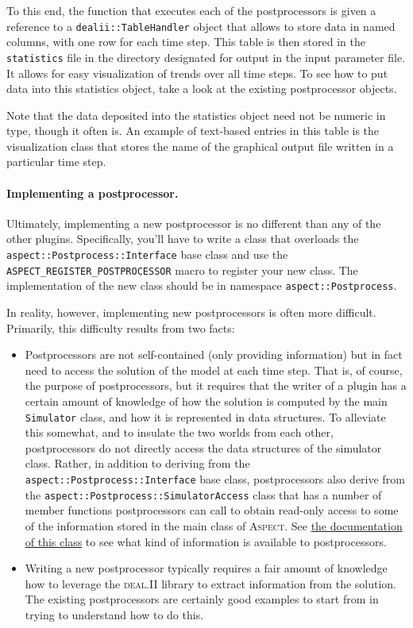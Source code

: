 \documentclass{article}
\newcommand{\dealii}{{\textsc{deal.II}}}
\newcommand{\aspect}{\textsc{Aspect}}
\begin{document}
To this end, the function that executes each of the postprocessors is given a
reference to a \texttt{dealii::TableHandler} object that allows to store data
in named columns, with one row for each time step. This table is then stored
in the \texttt{statistics} file in the directory designated for output in the
input parameter file. It allows for easy visualization of trends over all time
steps. To see how to put data into this statistics object, take a look at the
existing postprocessor objects.

Note that the data deposited into the statistics object need not be numeric in
type, though it often is. An example of text-based entries in this table is
the visualization class that stores the name of the graphical output file
written in a particular time step.

\paragraph{Implementing a postprocessor.}
Ultimately, implementing a new postprocessor is no different than any of the
other plugins. Specifically, you'll have to write a class that
overloads the \texttt{aspect::Postprocess::Interface} base class and use
the \texttt{ASPECT\_REGISTER\_POSTPROCESSOR} macro to register your new
class. The implementation of the new class should be in namespace
\texttt{aspect::Postprocess}.

In reality, however, implementing new postprocessors is often more
difficult. Primarily, this difficulty results from two facts:
\begin{itemize}
\item Postprocessors are not self-contained (only providing information) but
  in fact need to access the solution of the model at each time step. That is,
  of course, the purpose of postprocessors, but it requires that the writer of
  a plugin has a certain amount of knowledge of how the solution is computed
  by the main \texttt{Simulator} class, and how it is represented in data
  structures. To alleviate this somewhat, and to insulate the two worlds from
  each other, postprocessors do not directly access the data structures of the
  simulator class. Rather, in addition to deriving from the
  \texttt{aspect::Postprocess::Interface} base class, postprocessors also
  derive from the \texttt{aspect::Postprocess::SimulatorAccess} class that
  has a number of member functions postprocessors can call to obtain read-only
  access to some of the information stored in the main class of \aspect{}. See
  \href{doc/doxygen/classaspect_1_1Postprocess_1_1SimulatorAccess.html}{the
    documentation of this class} to see what kind of information is available to
  postprocessors.

\item Writing a new postprocessor typically
  requires a fair amount of knowledge how to leverage the \dealii{} library to
  extract information from the solution. The existing postprocessors are
  certainly good examples to start from in trying to understand how to do this.
\end{itemize}
\end{document}
